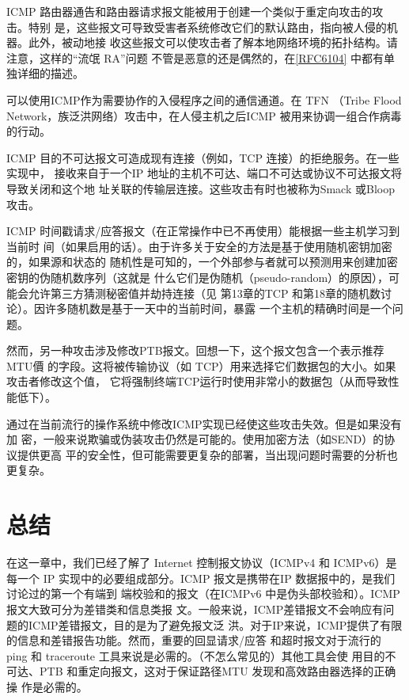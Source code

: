 ICMP 路由器通告和路由器请求报文能被用于创建一个类似于重定向攻击的攻击。特别
是，这些报文可导致受害者系统修改它们的默认路由，指向被人侵的机器。此外，被动地接
收这些报文可以使攻击者了解本地网络环境的拓扑结构。请注意，这样的“流氓 RA”问题
不管是恶意的还是偶然的，在\href{https://www.rfc-editor.org/rfc/rfc6104}{[RFC6104]} 中都有单独详细的描述。

可以使用ICMP作为需要协作的入侵程序之间的通信通道。在 TFN （Tribe Flood
Network，族泛洪网络）攻击中，在人侵主机之后ICMP 被用来协调一组合作病毒的行动。

ICMP 目的不可达报文可造成现有连接（例如，TCP 连接）的拒绝服务。在一些实现中，
接收来自于一个IP 地址的主机不可达、端口不可达或协议不可达报文将导致关闭和这个地
址关联的传输层连接。这些攻击有时也被称为Smack 或Bloop 攻击。

ICMP 时间戳请求/应答报文（在正常操作中已不再使用）能根据一些主机学习到当前时
间（如果启用的话）。由于许多关于安全的方法是基于使用随机密钥加密的，如果源和状态的
随机性是可知的，一个外部参与者就可以预测用来创建加密密钥的伪随机数序列（这就是
什么它们是伪随机（pseudo-random）的原因），可能会允许第三方猜测秘密值并劫持连接（见
第13章的TCP 和第18章的随机数讨论）。因许多随机数是基于一天中的当前时间，暴露
一个主机的精确时间是一个问题。

然而，另一种攻击涉及修改PTB报文。回想一下，这个报文包含一个表示推荐MTU價
的字段。这将被传输协议（如 TCP）用来选择它们数据包的大小。如果攻击者修改这个值，
它将强制终端TCP运行时使用非常小的数据包（从而导致性能低下）。

通过在当前流行的操作系统中修改ICMP实现已经使这些攻击失效。但是如果没有加
密，一般来说欺骗或伪装攻击仍然是可能的。使用加密方法（如SEND）的协议提供更高
平的安全性，但可能需要更复杂的部署，当出现问题时需要的分析也更复杂。

\section{总结}

在这一章中，我们已经了解了 Internet 控制报文协议（ICMPv4 和 ICMPv6）是每一个 IP
实现中的必要组成部分。ICMP 报文是携带在IP 数据报中的，是我们讨论过的第一个有端到
端校验和的报文（在ICMPv6 中是伪头部校验和）。ICMP报文大致可分为差错类和信息类报
文。一般来说，ICMP差错报文不会响应有问题的ICMP差错报文，目的是为了避免报文泛
洪。对于IP来说，ICMP提供了有限的信息和差错报告功能。然而，重要的回显请求/应答
和超时报文对于流行的 ping 和 traceroute 工具来说是必需的。（不怎么常见的）其他工具会使
用目的不可达、PTB 和重定向报文，这对于保证路径MTU 发现和高效路由器选择的正确操
作是必需的。

